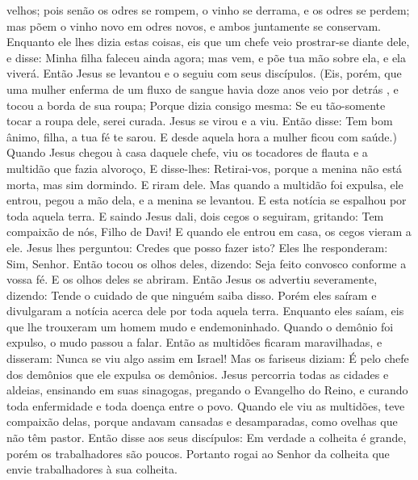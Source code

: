 {{} velhos; pois senão os odres se rompem, o vinho se derrama, e os odres se perdem; mas põem o vinho novo em odres novos, e ambos juntamente se conservam.
  Enquanto ele lhes dizia estas coisas, eis que um chefe
{} veio prostrar-se diante dele, e disse: Minha filha faleceu ainda agora; mas vem, e põe tua mão sobre ela, e ela viverá.
  Então Jesus se levantou e o seguiu com seus discípulos.
  (Eis, porém, que uma mulher enferma de um fluxo de sangue havia doze anos veio por detrás
{},  e tocou a borda de sua roupa;
  Porque dizia consigo mesma: Se eu tão-somente tocar a roupa dele, serei curada.
  Jesus se virou e a viu. Então disse: Tem bom ânimo, filha, a tua fé te sarou. E desde aquela hora a mulher ficou com saúde.)
  Quando Jesus chegou à casa daquele chefe, viu os tocadores de flauta e a multidão que fazia alvoroço,
  E disse-lhes: Retirai-vos, porque a menina não está morta, mas sim dormindo. E riram dele.
  Mas quando a multidão foi expulsa, ele entrou, pegou a mão dela, e a menina se levantou.
  E esta notícia se espalhou por toda aquela terra.
  E saindo Jesus dali, dois cegos o seguiram, gritando: Tem compaixão de nós, Filho de Davi!
  E quando ele entrou em casa, os cegos vieram a ele. Jesus lhes perguntou: Credes que posso fazer isto? Eles lhe responderam: Sim, Senhor.
  Então tocou os olhos deles, dizendo: Seja feito convosco conforme a vossa fé.
  E os olhos deles se abriram. Então Jesus os advertiu severamente, dizendo: Tende o cuidado de que ninguém saiba disso.
  Porém eles saíram e divulgaram a notícia acerca dele por toda aquela terra.
  Enquanto eles saíam, eis que lhe trouxeram um homem mudo e endemoninhado.
  Quando o demônio foi expulso, o mudo passou a falar. Então as multidões ficaram maravilhadas, e disseram: Nunca se viu algo assim em Israel!
  Mas os fariseus diziam: É pelo chefe dos demônios que ele expulsa os demônios.
  Jesus percorria todas as cidades e aldeias, ensinando em suas sinagogas, pregando o Evangelho do Reino, e curando toda enfermidade e toda doença entre o povo.
  Quando ele viu as multidões, teve compaixão delas, porque andavam cansadas e desamparadas, como ovelhas que não têm pastor.
  Então disse aos seus discípulos: Em verdade a colheita é grande, porém os trabalhadores são poucos.
  Portanto rogai ao Senhor da colheita que envie trabalhadores à sua colheita.
\par }

